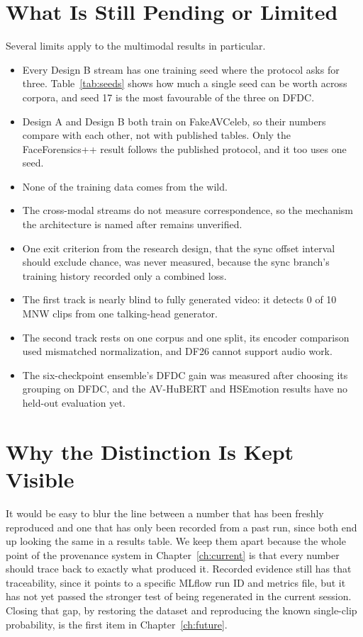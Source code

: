 \section{What Is Still Pending or Limited}

Several limits apply to the multimodal results in particular.

\begin{itemize}
    \item Every Design B stream has one training seed where the protocol asks
    for three. Table~\ref{tab:seeds} shows how much a single seed can be worth
    across corpora, and seed 17 is the most favourable of the three on DFDC.
    \item Design A and Design B both train on FakeAVCeleb, so their numbers
    compare with each other, not with published tables. Only the
    FaceForensics++ result follows the published protocol, and it too uses one
    seed.
    \item None of the training data comes from the wild.
    \item The cross-modal streams do not measure correspondence, so the
    mechanism the architecture is named after remains unverified.
    \item One exit criterion from the research design, that the sync offset
    interval should exclude chance, was never measured, because the sync
    branch's training history recorded only a combined loss.
    \item The first track is nearly blind to fully generated video: it detects
    0 of 10 MNW clips from one talking-head generator.
    \item The second track rests on one corpus and one split, its encoder
    comparison used mismatched normalization, and DF26 cannot support audio
    work.
    \item The six-checkpoint ensemble's DFDC gain was measured after choosing
    its grouping on DFDC, and the AV-HuBERT and HSEmotion results have no
    held-out evaluation yet.
\end{itemize}

\section{Why the Distinction Is Kept Visible}

It would be easy to blur the line between a number that has been freshly
reproduced and one that has only been recorded from a past run, since both end
up looking the same in a results table. We keep them apart because the whole
point of the provenance system in Chapter~\ref{ch:current} is that every number
should trace back to exactly what produced it. Recorded evidence still has that
traceability, since it points to a specific MLflow run ID and metrics file, but
it has not yet passed the stronger test of being regenerated in the current
session. Closing that gap, by restoring the dataset and reproducing the known
single-clip probability, is the first item in Chapter~\ref{ch:future}.

